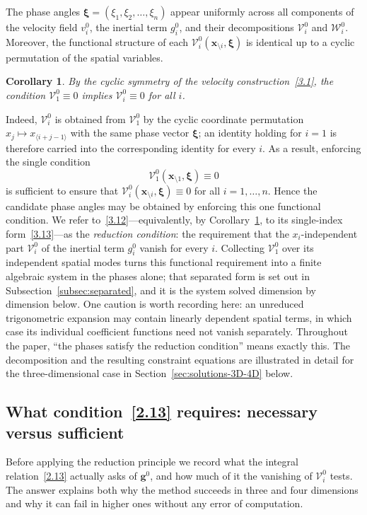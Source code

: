 \documentclass[11pt]{jfm}
\newtheorem{corollary}[lemma]{Corollary}
\numberwithin{equation}{section}
\begin{document}
The phase angles \( \boldsymbol{\xi} = (\xi_1, \xi_2, \dots, \xi_n) \) appear uniformly across all components of the velocity field \( v_i^0 \), the inertial term \( g_i^0 \), and their decompositions \( \mathcal{V}_i^0 \) and \( \mathcal{W}_i^0 \). Moreover, the functional structure of each \( \mathcal{V}_i^0(\boldsymbol{x}_{\setminus i}, \boldsymbol{\xi}) \) is identical up to a cyclic permutation of the spatial variables.
\begin{corollary}
\label{cor:cyclic}
By the cyclic symmetry of the velocity construction~\eqref{3.1}, the condition
$\mathcal{V}_1^0 \equiv 0$ implies $\mathcal{V}_i^0 \equiv 0$ for all $i$.
\end{corollary}

\noindent Indeed, $\mathcal{V}_i^0$ is obtained from $\mathcal{V}_1^0$ by the cyclic coordinate
permutation $x_j\mapsto x_{\langle i+j-1\rangle}$ with the same phase vector $\boldsymbol{\xi}$;
an identity holding for $i=1$ is therefore carried into the corresponding identity for every $i$.
As a result, enforcing the single condition
\begin{equation}
\label{3.13}
\mathcal{V}_1^0(\boldsymbol{x}_{\setminus 1}, \boldsymbol{\xi}) \equiv 0
\end{equation}
is sufficient to ensure that \( \mathcal{V}_i^0(\boldsymbol{x}_{\setminus i}, \boldsymbol{\xi}) \equiv 0 \) for all \( i = 1, \dots, n \). Hence the candidate phase angles may be obtained by enforcing this one functional condition. We refer to~\eqref{3.12}---equivalently, by Corollary~\ref{cor:cyclic}, to its single-index form~\eqref{3.13}---as the \emph{reduction condition}: the requirement that the $x_i$-independent part $\mathcal{V}_i^0$ of the inertial term $g_i^0$ vanish for every $i$. Collecting $\mathcal{V}_1^0$ over its independent spatial modes turns this functional requirement
into a finite algebraic system in the phases alone; that separated form is set out
in Subsection~\ref{subsec:separated}, and it is the system solved dimension by dimension below. One caution
is worth recording here: an unreduced trigonometric expansion may contain linearly dependent
spatial terms, in which case its individual coefficient functions need not vanish separately.
Throughout the paper, ``the phases satisfy the reduction condition'' means exactly this. The decomposition and the resulting constraint equations are illustrated in detail for the three-dimensional case in Section~\ref{sec:solutions-3D-4D} below.

\subsection{What condition~\eqref{2.13} requires: necessary versus sufficient}
\label{subsec:nec-suf}
Before applying the reduction principle we record what the integral relation~\eqref{2.13}
actually asks of $\boldsymbol{g}^0$, and how much of it the vanishing of $\mathcal{V}_i^0$
tests. The answer explains both why the method succeeds in three and four dimensions and why
it can fail in higher ones without any error of computation.
\end{document}

